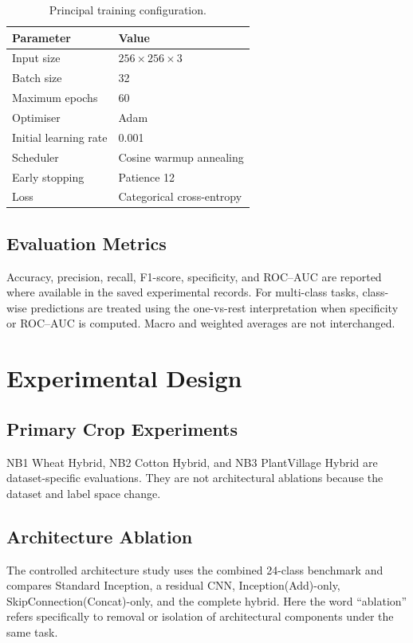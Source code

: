 \documentclass[a4paper,fleqn]{cas-dc}
\begin{document}
\begin{table}[!t]
\centering
\caption{Principal training configuration.}
\label{tab:training}
\begin{tabular}{ll}
\toprule
Parameter & Value \\
\midrule
Input size & $256\times256\times3$ \\
Batch size & 32 \\
Maximum epochs & 60 \\
Optimiser & Adam \\
Initial learning rate & 0.001 \\
Scheduler & Cosine warmup annealing \\
Early stopping & Patience 12 \\
Loss & Categorical cross-entropy \\
\bottomrule
\end{tabular}
\end{table}

\subsection{Evaluation Metrics}
Accuracy, precision, recall, F1-score, specificity, and ROC--AUC are reported where available in the saved experimental records. For multi-class tasks, class-wise predictions are treated using the one-vs-rest interpretation when specificity or ROC--AUC is computed. Macro and weighted averages are not interchanged.

\section{Experimental Design}
\subsection{Primary Crop Experiments}
NB1 Wheat Hybrid, NB2 Cotton Hybrid, and NB3 PlantVillage Hybrid are dataset-specific evaluations. They are not architectural ablations because the dataset and label space change.

\subsection{Architecture Ablation}
The controlled architecture study uses the combined 24-class benchmark and compares Standard Inception, a residual CNN, Inception(Add)-only, SkipConnection(Concat)-only, and the complete hybrid. Here the word ``ablation'' refers specifically to removal or isolation of architectural components under the same task.
\end{document}
